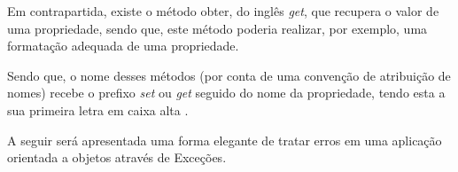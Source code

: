 Em contrapartida, existe o método obter, do inglês \textit{get}, que recupera o
valor de uma propriedade, sendo que, este método poderia realizar, por exemplo,
uma formatação adequada de uma propriedade.

Sendo que, o nome desses métodos (por conta de uma convenção de atribuição de
nomes) recebe o prefixo \textit{set} ou \textit{get} seguido do nome da
propriedade, tendo esta a sua primeira letra em caixa alta \cite{javaComoProgramar}.

A seguir será apresentada uma forma elegante de tratar erros em uma aplicação
orientada a objetos através de Exceções.